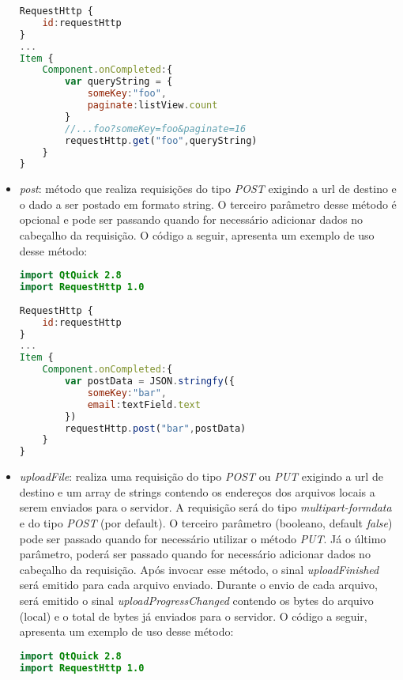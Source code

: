 \begin{itemize}
\begin{center}
\begin{lstlisting}[language=qml]
RequestHttp {
	id:requestHttp
}
...
Item {
	Component.onCompleted:{
		var queryString = {
			someKey:"foo",
			paginate:listView.count
		}
		//...foo?someKey=foo&paginate=16
		requestHttp.get("foo",queryString)
	}
}
\end{lstlisting}
\end{center}

	\item \textit{post}: método que realiza requisições do tipo \textit{POST} exigindo a url de destino e o dado a ser postado em formato string. O terceiro parâmetro desse método é opcional e pode ser passando quando for necessário adicionar dados no cabeçalho da requisição. O código a seguir, apresenta um exemplo de uso desse método:
\begin{center}
\begin{lstlisting}[language=qml]
import QtQuick 2.8
import RequestHttp 1.0
	
RequestHttp {
	id:requestHttp
}
...
Item {
	Component.onCompleted:{
		var postData = JSON.stringfy({
			someKey:"bar",
			email:textField.text
		})
		requestHttp.post("bar",postData)
	}
}
\end{lstlisting}
\end{center}

	\item \textit{uploadFile}: realiza uma requisição do tipo \textit{POST} ou \textit{PUT} exigindo a url de destino e um array de strings contendo os endereços dos arquivos locais a serem enviados para o servidor. A requisição será do tipo \textit{multipart-formdata} e do tipo \textit{POST} (por default). O terceiro parâmetro (booleano, default \textit{false}) pode ser passado quando for necessário utilizar o método \textit{PUT}. Já o último parâmetro, poderá ser passado quando for necessário adicionar dados no cabeçalho da requisição. Após invocar esse método, o sinal \textit{uploadFinished} será emitido para cada arquivo enviado. Durante o envio de cada arquivo, será emitido o sinal \textit{uploadProgressChanged} contendo os bytes do arquivo (local) e o total de bytes já enviados para o servidor. O código a seguir, apresenta um exemplo de uso desse método:
\begin{center}
\begin{lstlisting}[language=qml]
import QtQuick 2.8
import RequestHttp 1.0
	

\end{lstlisting}
\end{center}
\end{itemize}
